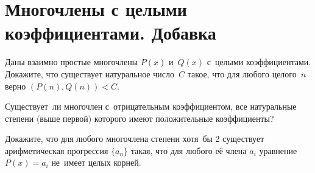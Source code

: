 
\section*{Многочлены с целыми коэффициентами. Добавка}


\begin{problems}

\item
Даны взаимно простые многочлены $P(x)$ и~$Q(x)$ с~целыми коэффициентами.
Докажите, что существует натуральное число~$C$ такое, что для любого целого~$n$
верно $(P(n), Q(n)) < C$.

\item
Существует~ли многочлен с~отрицательным коэффициентом, все натуральные степени
(выше первой) которого имеют положительные коэффициенты?

\item
Докажите, что для любого многочлена степени хотя~бы 2 существует арифметическая
прогрессия $\{ a_n \}$ такая, что для любого её члена $a_i$ уравнение
$P(x) = a_i$ не~имеет целых корней.

\end{problems}

